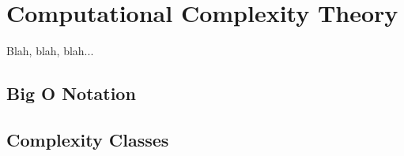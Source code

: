 
\toclineskip
\section{Computational Complexity Theory}



Blah, blah, blah... \\


\subsection{Big O Notation}


\subsection{Complexity Classes}


